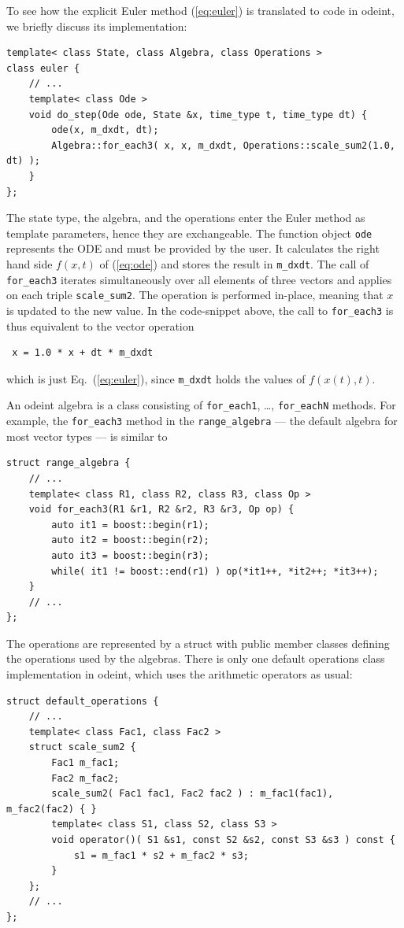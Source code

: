 \documentclass[final]{siamltex}
\newcommand{\code}[1]{\lstinline$#1$}
\newcommand{\eqref}[1]{(\ref{#1})}
\begin{document}
To see how the explicit Euler method \eqref{eq:euler} is translated to
code in odeint, we briefly discuss its implementation:
\begin{lstlisting}
template< class State, class Algebra, class Operations >
class euler {
    // ...
    template< class Ode >
    void do_step(Ode ode, State &x, time_type t, time_type dt) {
        ode(x, m_dxdt, dt);
        Algebra::for_each3( x, x, m_dxdt, Operations::scale_sum2(1.0, dt) );
    }
};
\end{lstlisting}
The state type, the algebra, and the operations enter the Euler method
as template parameters, hence they are exchangeable. The function
object \code{ode} represents the ODE and must be provided by the
user. It calculates the right hand side $f(x,t)$ of \eqref{eq:ode} and
stores the result in \code{m_dxdt}.  The call of \code{for_each3}
iterates simultaneously over all elements of three vectors and applies
on each triple \code{scale_sum2}. The operation is performed in-place,
meaning that $x$ is updated to the new value.  In the code-snippet
above, the call to \code{for_each3} is thus equivalent to the vector
operation
\begin{lstlisting}
 x = 1.0 * x + dt * m_dxdt
\end{lstlisting}
which is just Eq.~\eqref{eq:euler}, since \code{m_dxdt} holds the values of
$f(x(t), t)$.

An odeint algebra is a class consisting of
\code{for_each1}, \dots, \code{for_eachN} methods. For example, the
\code{for_each3} method in the \code{range_algebra} --- the default algebra for
most vector types --- is similar to
\begin{lstlisting}
struct range_algebra {
    // ...
    template< class R1, class R2, class R3, class Op >
    void for_each3(R1 &r1, R2 &r2, R3 &r3, Op op) {
        auto it1 = boost::begin(r1);
        auto it2 = boost::begin(r2);
        auto it3 = boost::begin(r3);
        while( it1 != boost::end(r1) ) op(*it1++, *it2++; *it3++);
    }
    // ...
};
\end{lstlisting}
The operations are represented by a struct with public member classes defining the
operations used by the algebras. There is only one default
operations class implementation in odeint, which uses the arithmetic operators as usual:
\begin{lstlisting}
struct default_operations {
    // ...
    template< class Fac1, class Fac2 >
    struct scale_sum2 {
        Fac1 m_fac1;
        Fac2 m_fac2;
        scale_sum2( Fac1 fac1, Fac2 fac2 ) : m_fac1(fac1), m_fac2(fac2) { }
        template< class S1, class S2, class S3 >
        void operator()( S1 &s1, const S2 &s2, const S3 &s3 ) const {
            s1 = m_fac1 * s2 + m_fac2 * s3;
        }
    };
    // ...
};
\end{lstlisting}
\end{document}

